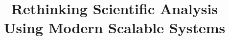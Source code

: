 \documentclass{acm_proc_article-sp}
\begin{document}
\title{Rethinking Scientific Analysis Using \linebreak Modern Scalable Systems}
%
%
%
%
%

%
\author{}
%
%


\maketitle
\end{document}
